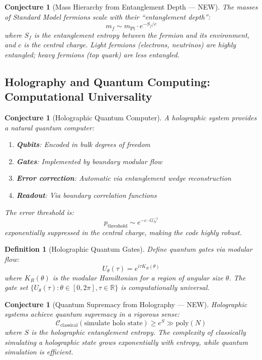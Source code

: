 \documentclass[12pt,a4paper]{article}
\newtheorem{conjecture}[theorem]{Conjecture}
\newtheorem{definition}[theorem]{Definition}
\begin{document}
\begin{conjecture}[Mass Hierarchy from Entanglement Depth --- NEW]
The masses of Standard Model fermions scale with their ``entanglement depth'':
\begin{equation}
m_f \sim m_{\text{Pl}} \cdot e^{-S_f/c}
\end{equation}
where $S_f$ is the entanglement entropy between the fermion and its environment, and $c$ is the central charge. Light fermions (electrons, neutrinos) are highly entangled; heavy fermions (top quark) are less entangled.
\end{conjecture}

\subsection{Holography and Quantum Computing: Computational Universality}

\begin{conjecture}[Holographic Quantum Computer]
A holographic system provides a natural quantum computer:
\begin{enumerate}
    \item \textbf{Qubits}: Encoded in bulk degrees of freedom
    \item \textbf{Gates}: Implemented by boundary modular flow
    \item \textbf{Error correction}: Automatic via entanglement wedge reconstruction
    \item \textbf{Readout}: Via boundary correlation functions
\end{enumerate}
The error threshold is:
\begin{equation}
p_{\text{threshold}} \sim e^{-c \cdot G_N^{-1}}
\end{equation}
exponentially suppressed in the central charge, making the code highly robust.
\end{conjecture}

\begin{definition}[Holographic Quantum Gates]
Define quantum gates via modular flow:
\begin{equation}
U_{\theta}(\tau) = e^{i \tau K_R(\theta)}
\end{equation}
where $K_R(\theta)$ is the modular Hamiltonian for a region of angular size $\theta$. The gate set $\{U_\theta(\tau) : \theta \in [0, 2\pi], \tau \in \mathbb{R}\}$ is computationally universal.
\end{definition}

\begin{conjecture}[Quantum Supremacy from Holography --- NEW]
Holographic systems achieve quantum supremacy in a rigorous sense:
\begin{equation}
\mathcal{C}_{\text{classical}}(\text{simulate holo state}) \geq e^{S} \gg \text{poly}(N)
\end{equation}
where $S$ is the holographic entanglement entropy. The complexity of classically simulating a holographic state grows exponentially with entropy, while quantum simulation is efficient.
\end{conjecture}
\end{document}
